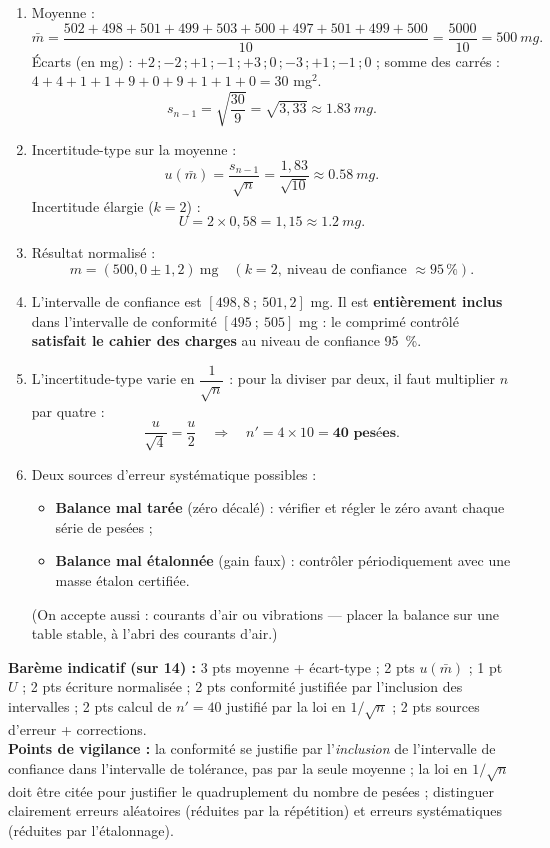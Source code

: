 \documentclass[11pt]{article}
\begin{document}
\begin{corrige}
\begin{enumerate}
\item Moyenne :
\[ \bar{m} = \frac{502 + 498 + 501 + 499 + 503 + 500 + 497 + 501 + 499 + 500}{10} = \frac{5000}{10} = \SI{500}{mg}. \]
Écarts (en mg) : $+2\,;-2\,;+1\,;-1\,;+3\,;0\,;-3\,;+1\,;-1\,;0$ ; somme des carrés : $4+4+1+1+9+0+9+1+1+0 = 30$ mg$^2$.
\[ s_{n-1} = \sqrt{\frac{30}{9}} = \sqrt{3{,}33} \approx \SI{1,83}{mg}. \]
\item Incertitude-type sur la moyenne :
\[ u(\bar{m}) = \frac{s_{n-1}}{\sqrt{n}} = \frac{1{,}83}{\sqrt{10}} \approx \SI{0,58}{mg}. \]
Incertitude élargie ($k = 2$) :
\[ U = 2 \times 0{,}58 = 1{,}15 \approx \SI{1,2}{mg}. \]
\item Résultat normalisé :
\[ \boxed{m = (500{,}0 \pm 1{,}2)~\text{mg} \quad (k = 2,\ \text{niveau de confiance } \approx 95\,\%)}. \]
\item L'intervalle de confiance est $[498{,}8 \ ;\ 501{,}2]$ mg. Il est \textbf{entièrement inclus} dans l'intervalle de conformité $[495 \ ;\ 505]$ mg : le comprimé contrôlé \textbf{satisfait le cahier des charges} au niveau de confiance \SI{95}{\%}.
\item L'incertitude-type varie en $\dfrac{1}{\sqrt{n}}$ : pour la diviser par deux, il faut multiplier $n$ par quatre :
\[ \frac{u}{\sqrt{4}} = \frac{u}{2} \quad \Longrightarrow \quad n' = 4 \times 10 = \textbf{40 pesées}. \]
\item Deux sources d'erreur systématique possibles :
\begin{itemize}
\item \textbf{Balance mal tarée} (zéro décalé) : vérifier et régler le zéro avant chaque série de pesées ;
\item \textbf{Balance mal étalonnée} (gain faux) : contrôler périodiquement avec une masse étalon certifiée.
\end{itemize}
(On accepte aussi : courants d'air ou vibrations — placer la balance sur une table stable, à l'abri des courants d'air.)
\end{enumerate}
\textbf{Barème indicatif (sur 14) :} 3 pts moyenne + écart-type ; 2 pts $u(\bar{m})$ ; 1 pt $U$ ; 2 pts écriture normalisée ; 2 pts conformité justifiée par l'inclusion des intervalles ; 2 pts calcul de $n' = 40$ justifié par la loi en $1/\sqrt{n}$ ; 2 pts sources d'erreur + corrections.\\
\textbf{Points de vigilance :} la conformité se justifie par l'\emph{inclusion} de l'intervalle de confiance dans l'intervalle de tolérance, pas par la seule moyenne ; la loi en $1/\sqrt{n}$ doit être citée pour justifier le quadruplement du nombre de pesées ; distinguer clairement erreurs aléatoires (réduites par la répétition) et erreurs systématiques (réduites par l'étalonnage).
\end{corrige}
\end{document}

